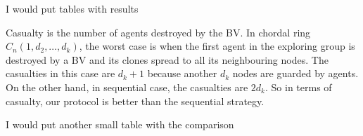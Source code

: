 \color{blue}
I would put tables with results\color{black}


Casualty is the number of agents destroyed by the BV. In chordal ring $C_n(1, d_2,\dots, d_k)$, the worst case is when the first agent in the exploring group is destroyed by a BV and its clones  spread to all its neighbouring nodes. The casualties in this case are $d_k+1$ because another $d_k$ nodes are guarded by agents. On the other hand,
  in sequential case, the casualties are $2d_k$. So in terms of casualty, our protocol is better than the sequential strategy.

\color{blue}
I would put another small  table  with the comparison
\color{black}




